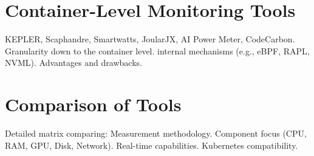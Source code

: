 \section{Container-Level Monitoring Tools}
    KEPLER, Scaphandre, Smartwatts, JoularJX, AI Power Meter, CodeCarbon.
    Granularity down to the container level.
    internal mechanisms (e.g., eBPF, RAPL, NVML).
    Advantages and drawbacks.
    
\section{Comparison of Tools}
    Detailed matrix comparing:
        Measurement methodology.
        Component focus (CPU, RAM, GPU, Disk, Network).
        Real-time capabilities.
        Kubernetes compatibility.

